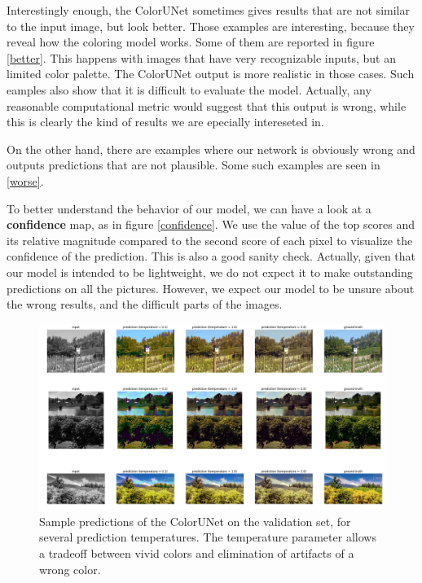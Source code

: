 \documentclass[10pt,twocolumn,letterpaper]{article}
\begin{document}
Interestingly enough, the ColorUNet sometimes gives results that are not similar to the input image, but look better. Those examples are interesting, because they reveal how the coloring model works. Some of them are reported in figure \ref{better}. This happens with images that have very recognizable inputs, but an limited color palette. The ColorUNet output is more realistic in those cases.
Such eamples also show that it is difficult to evaluate the model. Actually, any reasonable computational metric would suggest that this output is wrong, while this is clearly the kind of results we are epecially intereseted in.

On the other hand, there are examples where our network is obviously wrong and outputs predictions that are not plausible. Some such examples are seen in \ref{worse}.

To better understand the behavior of our model, we can have a look at a \textbf{confidence} map, as in figure \ref{confidence}. We use the value of the top scores and its relative magnitude compared to the second score of each pixel to visualize the confidence of the prediction. This is also a good sanity check. Actually, given that our model is intended to be lightweight, we do not expect it to make outstanding predictions on all the pictures. However, we expect our model to be unsure about the wrong results, and the difficult parts of the images.  

\begin{figure}
\begin{center}
\includegraphics[width=450px]{good}
\caption{Sample predictions of the ColorUNet on the validation set, for several prediction temperatures. The temperature parameter allows a tradeoff between vivid colors and elimination of artifacts of a wrong color.}
\label{good}
\end{center}
\end{figure}
\end{document}
